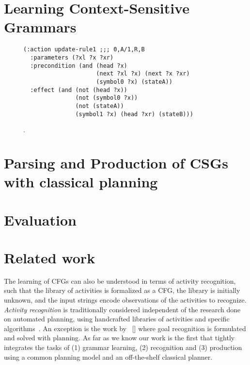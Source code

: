 \documentclass[letterpaper]{article} %
\begin{document}
\section{Learning Context-Sensitive Grammars}

\begin{figure}
\begin{footnotesize}
\begin{verbatim}
(:action update-rule1 ;;; 0,A/1,R,B
  :parameters (?xl ?x ?xr)
  :precondition (and (head ?x) 
                     (next ?xl ?x) (next ?x ?xr) 
                     (symbol0 ?x) (stateA))
  :effect (and (not (head ?x)) 
               (not (symbol0 ?x)) 
               (not (stateA))
               (symbol1 ?x) (head ?xr) (stateB)))
\end{verbatim}
\end{footnotesize}
 \caption{\small .}
\label{fig:stack}
\end{figure}


\section{Parsing and Production of CSGs with classical planning}


\section{Evaluation}


\section{Related work}

The learning of CFGs can also be understood in terms of activity recognition, such that the library of activities is formalized as a CFG, the library is initially unknown, and the input strings encode observations of the activities to recognize. {\it Activity recognition} is traditionally considered independent of the research done on automated planning, using handcrafted libraries of activities and specific algorithms~\cite{ravi2005activity}. An exception is the work by \citeauthor{ramirez2009plan}~[\citeyear{ramirez2009plan,ramirez2010probabilistic}] where goal recognition is formulated and solved with planning. As far as we know our work is the first that tightly integrates the tasks of (1) grammar learning, (2) recognition and (3) production using a common planning model and an off-the-shelf classical planner. 
\end{document}
